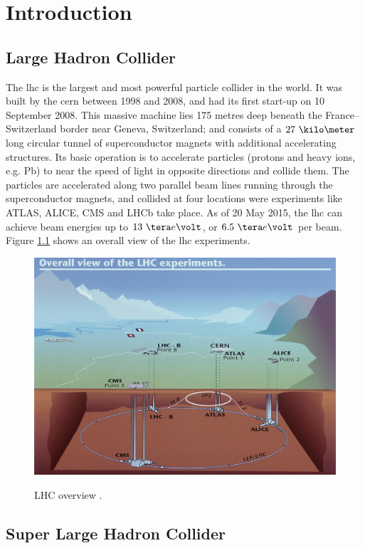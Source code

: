 \documentclass[main.tex]{subfiles}
\begin{document}
\chapter{Introduction}

\section{Large Hadron Collider}

The \gls{lhc} is the largest and most powerful particle collider in the world. It was built by the \gls{cern} \cite{cernweb} between 1998 and 2008, and had its first start-up on 10 September 2008. This massive machine lies 175 metres deep beneath the France–Switzerland border near Geneva, Switzerland; and consists of a $27~\kilo\meter$ long circular tunnel of superconductor magnets with additional accelerating structures. Its basic operation is to accelerate particles (protons and heavy ions, e.g. Pb) to near the speed of light in opposite directions and collide them. The particles are accelerated along two parallel beam lines running through the superconductor magnets, and collided at four locations were experiments like ATLAS\cite{atlasweb}, ALICE\cite{aliceweb}, CMS\cite{cmsweb} and LHCb\cite{lhcbweb} take place. As of 20 May 2015, the \gls{lhc} can achieve beam energies up to $13~\tera e\volt$, or $6.5~\tera e\volt$ per beam. Figure \ref{fig:lhcov} shows an overall view of the \gls{lhc} experiments.

\begin{figure} %
\includegraphics[width=0.7\linewidth]{../img/lhc.jpg}  \\[0.1 cm]
\caption{LHC overview \cite{lhcpic}.}
\label{fig:lhcov}
\end{figure}

\section{Super Large Hadron Collider}
\end{document}
